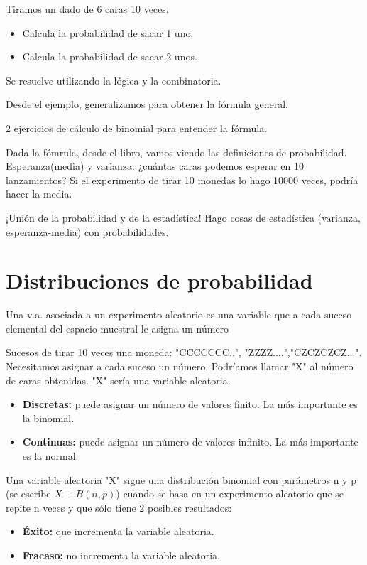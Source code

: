 \begin{example}

Tiramos un dado de 6 caras 10 veces.
\begin{itemize}
    \item Calcula la probabilidad de sacar 1 uno.
    \item Calcula la probabilidad de sacar 2 unos.
\end{itemize}

Se resuelve utilizando la lógica y la combinatoria. 

\end{example}

Desde el ejemplo, generalizamos para obtener la fórmula general.

2 ejercicios de cálculo de binomial para entender la fórmula. 

Dada la fómrula, desde el libro, vamos viendo las definiciones de probabilidad. Esperanza(media) y varianza: ¿cuántas caras podemos esperar en 10 lanzamientos? Si el experimento de tirar 10 monedas lo hago 10000 veces, podría hacer la media. 

¡Unión de la probabilidad y de la estadística! Hago cosas de estadística (varianza, esperanza-media) con probabilidades.


\section{Distribuciones de probabilidad}

\begin{defn}
Una v.a. asociada a un experimento aleatorio es una variable que a cada suceso elemental del espacio muestral le asigna un número
\end{defn}
Sucesos de tirar 10 veces una moneda: "CCCCCCC..", "ZZZZ....","CZCZCZCZ...". Necesitamos asignar a cada suceso un número. 
%
Podríamos llamar "X" al número de caras obtenidas. "X" sería una variable aleatoria.

\begin{itemize}
    \item \textbf{Discretas:} puede asignar un número de valores finito. La más importante es la binomial.
    \item \textbf{Continuas: } puede asignar un número de valores infinito. La más importante es la normal.
\end{itemize}

\begin{defn}
Una variable aleatoria "X" sigue una distribución binomial con parámetros n y p (se escribe $X\equiv B(n,p)$) cuando se basa en un experimento aleatorio que se repite n veces y que sólo tiene 2 posibles resultados:
\begin{itemize}
    \item \textbf{Éxito:} que incrementa la variable aleatoria.
    \item \textbf{Fracaso:} no incrementa la variable aleatoria.
\end{itemize}
\end{defn}

